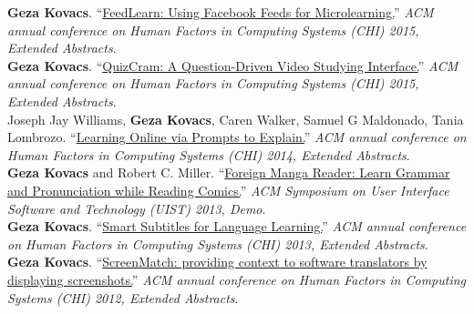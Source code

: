 \textbf{Geza Kovacs}. ``\href{https://hci.stanford.edu/publications/2015/feedlearn/feedlearn-chi2015.pdf}{FeedLearn: Using Facebook Feeds for Microlearning.}'' \emph{ACM annual conference on Human Factors in Computing Systems (CHI) 2015, Extended Abstracts}.\\ %

\textbf{Geza Kovacs}. ``\href{https://hci.stanford.edu/publications/2015/quizcram/quizcram-chi2015.pdf}{QuizCram: A Question-Driven Video Studying Interface.}'' \emph{ACM annual conference on Human Factors in Computing Systems (CHI) 2015, Extended Abstracts}.\\

{\small Joseph Jay Williams,} \textbf{Geza Kovacs}, {\small Caren Walker, Samuel G Maldonado, Tania Lombrozo.} ``\href{https://hci.stanford.edu/publications/2014/explain/explain-chi2014.pdf}{Learning Online via Prompts to Explain.}'' \emph{ACM annual conference on Human Factors in Computing Systems (CHI) 2014, Extended Abstracts}.\\

\textbf{Geza Kovacs} {\small and Robert C. Miller.} ``\href{http://up.csail.mit.edu/other-pubs/uist2013-mangareader.pdf}{Foreign Manga Reader: Learn Grammar and Pronunciation while Reading Comics.}'' \emph{ACM Symposium on User Interface Software and Technology (UIST) 2013, Demo}.\\

\textbf{Geza Kovacs}. ``\href{http://up.csail.mit.edu/other-pubs/chi2013-smartsubs.pdf}{Smart Subtitles for Language Learning.}'' \emph{ACM annual conference on Human Factors in Computing Systems (CHI) 2013, Extended Abstracts}.\\ %

\textbf{Geza Kovacs}. ``\href{http://up.csail.mit.edu/other-pubs/chi2012-screenshots-for-translation-context.pdf}{ScreenMatch: providing context to software translators by displaying screenshots.}'' \emph{ACM annual conference on Human Factors in Computing Systems (CHI) 2012, Extended Abstracts}.\\ %


